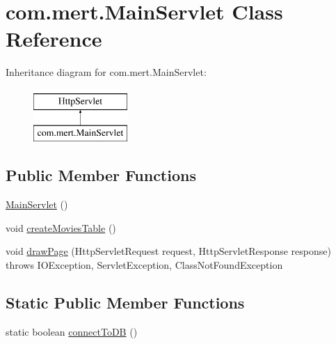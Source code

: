 \hypertarget{classcom_1_1mert_1_1_main_servlet}{}\section{com.\+mert.\+Main\+Servlet Class Reference}
\label{classcom_1_1mert_1_1_main_servlet}
Inheritance diagram for com.\+mert.\+Main\+Servlet\+:\begin{figure}[H]
\begin{center}
\leavevmode
\includegraphics[height=2.000000cm]{classcom_1_1mert_1_1_main_servlet}
\end{center}
\end{figure}
\subsection*{Public Member Functions}
\begin{DoxyCompactItemize}
\item 
\hyperlink{classcom_1_1mert_1_1_main_servlet_a4cd4816907ef657cfb6c7a2403551360}{Main\+Servlet} ()
\item 
void \hyperlink{classcom_1_1mert_1_1_main_servlet_a2f201a8c0bc5b379d4980eae65e774ba}{create\+Movies\+Table} ()
\item 
void \hyperlink{classcom_1_1mert_1_1_main_servlet_a4add4495834801a2cd1aad092e08d2fb}{draw\+Page} (Http\+Servlet\+Request request, Http\+Servlet\+Response response)  throws I\+O\+Exception, Servlet\+Exception, Class\+Not\+Found\+Exception 
\end{DoxyCompactItemize}
\subsection*{Static Public Member Functions}
\begin{DoxyCompactItemize}
\item 
static boolean \hyperlink{classcom_1_1mert_1_1_main_servlet_a44e2c429b5f5c9e74f58d8ec0c044e63}{connect\+To\+DB} ()
\end{DoxyCompactItemize}
